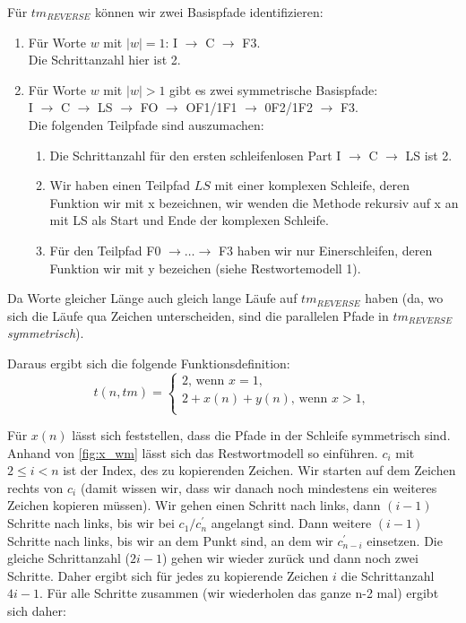 Für $tm_{REVERSE}$ können wir zwei Basispfade identifizieren:
\begin{enumerate}
        \item Für Worte $w$ mit $|w| = 1$: I $\rightarrow$ C $\rightarrow$ F3.\\
            Die Schrittanzahl hier ist 2.
        \item Für Worte $w$ mit $|w| > 1$ gibt es zwei symmetrische Basispfade:\\
            I $\rightarrow$ C $\rightarrow$ LS $\rightarrow$ FO $\rightarrow$ OF1/1F1 $\rightarrow$ 0F2/1F2 $\rightarrow$ F3.\\
            Die folgenden Teilpfade sind auszumachen:
            \begin{enumerate}
                \item Die Schrittanzahl für den ersten schleifenlosen Part I $\rightarrow$ C $\rightarrow$ LS ist 2.\\
                \item Wir haben einen Teilpfad $LS$ mit einer komplexen Schleife, deren Funktion wir mit x bezeichnen,
                    wir wenden die Methode rekursiv auf x an mit LS als Start und Ende der komplexen Schleife.
                \item Für den Teilpfad F0 $\rightarrow \ldots \rightarrow$ F3 haben wir nur Einerschleifen,
                    deren Funktion wir mit y bezeichen (siehe Restwortemodell 1).
            \end{enumerate}
\end{enumerate}

Da Worte gleicher Länge auch gleich lange Läufe auf $tm_{REVERSE}$ haben
(da, wo sich die Läufe qua Zeichen unterscheiden,
sind die parallelen Pfade in $tm_{REVERSE}$ \emph{symmetrisch}).

Daraus ergibt sich die folgende Funktionsdefinition:
\[
    t(n, tm) = \begin{cases}
        2\text{, wenn } x = 1,\\
        2 + x(n) + y(n) \text{, wenn } x > 1,\\
    \end{cases}
\]
            
Für $x(n)$ lässt sich feststellen, dass die Pfade in der Schleife symmetrisch sind.
Anhand von \autoref{fig:x_wm} lässt sich das Restwortmodell so einführen.
$c_i$ mit $2 \leq i < n$ ist der Index, des zu kopierenden Zeichen.
Wir starten auf dem Zeichen rechts von $c_i$ (damit wissen wir,
dass wir danach noch mindestens ein weiteres Zeichen kopieren müssen).
Wir gehen einen Schritt nach links,
dann $(i-1)$ Schritte nach links, bis wir bei $c_1/c^{'}_{n}$ angelangt sind.
Dann weitere $(i-1)$ Schritte nach links, bis wir an dem Punkt sind, an dem
wir $c^{'}_{n-i}$ einsetzen.
Die gleiche Schrittanzahl ($2i -1$) gehen wir wieder zurück und dann noch zwei Schritte.
Daher ergibt sich für jedes zu kopierende Zeichen $i$ die Schrittanzahl $4i - 1$.
Für alle Schritte zusammen (wir wiederholen das ganze n-2 mal) ergibt sich daher:

